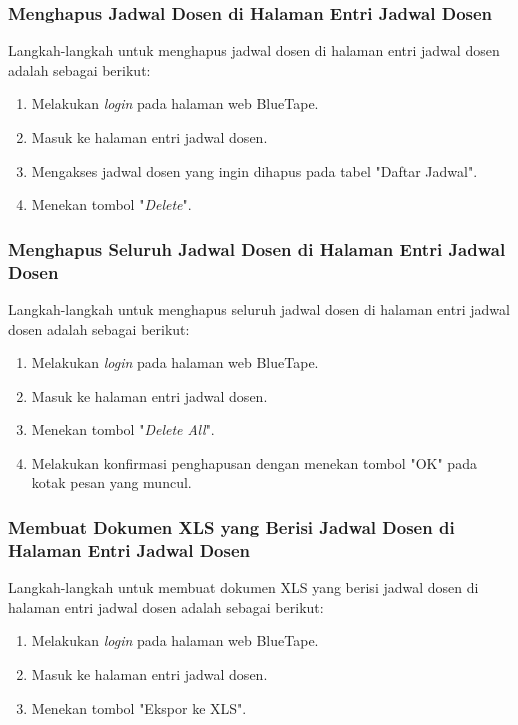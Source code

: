\subsubsection{Menghapus Jadwal Dosen di Halaman Entri Jadwal Dosen}
\label{subsubsec:skenario_menghapus_jadwal_dosen_di_halaman_entri_jadwal_dosen}
Langkah-langkah untuk menghapus jadwal dosen di halaman entri jadwal dosen adalah sebagai berikut:

\begin{enumerate}
    \item Melakukan \textit{login} pada halaman web BlueTape.
    \item Masuk ke halaman entri jadwal dosen.
    \item Mengakses jadwal dosen yang ingin dihapus pada tabel "Daftar Jadwal".
    \item Menekan tombol "\textit{Delete}".
\end{enumerate}

\subsubsection{Menghapus Seluruh Jadwal Dosen di Halaman Entri Jadwal Dosen}
\label{subsubsec:skenario_menghapus_seluruh_jadwal_dosen_di_halaman_entri_jadwal_dosen}
Langkah-langkah untuk menghapus seluruh jadwal dosen di halaman entri jadwal dosen adalah sebagai berikut:

\begin{enumerate}
    \item Melakukan \textit{login} pada halaman web BlueTape.
    \item Masuk ke halaman entri jadwal dosen.
    \item Menekan tombol "\textit{Delete All}".
    \item Melakukan konfirmasi penghapusan dengan menekan tombol "OK" pada kotak pesan yang muncul.
\end{enumerate}

\subsubsection{Membuat Dokumen XLS yang Berisi Jadwal Dosen di Halaman Entri Jadwal Dosen}
\label{subsubsec:skenario_membuat_dokumen_xls_yang_berisi_jadwal_dosen_di_halaman_entri_jadwal_dosen}
Langkah-langkah untuk membuat dokumen XLS yang berisi jadwal dosen di halaman entri jadwal dosen adalah sebagai berikut:

\begin{enumerate}
    \item Melakukan \textit{login} pada halaman web BlueTape.
    \item Masuk ke halaman entri jadwal dosen.
    \item Menekan tombol "Ekspor ke XLS".
\end{enumerate}

